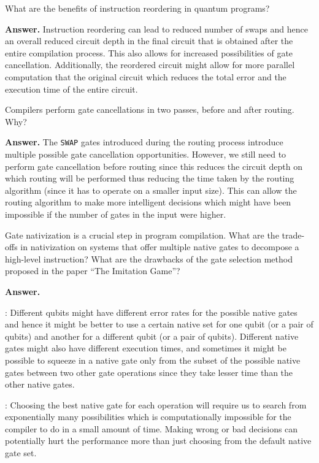 \begin{question}
    What are the benefits of instruction reordering in quantum programs?
\end{question}
\textbf{Answer.} Instruction reordering can lead to reduced number of swaps and hence an overall reduced circuit depth in the final circuit that is obtained after the entire compilation process. This also allows for increased possibilities of gate cancellation. Additionally, the reordered circuit might allow for more parallel computation that the original circuit which reduces the total error and the execution time of the entire circuit.

\tcbline{}

\begin{question}
    Compilers perform gate cancellations in two passes, before and after routing. Why?
\end{question}
\textbf{Answer.} The \texttt{SWAP} gates introduced during the routing process introduce multiple possible gate cancellation opportunities. However, we still need to perform gate cancellation before routing since this reduces the circuit depth on which routing will be performed thus reducing the time taken by the routing algorithm (since it has to operate on a smaller input size). This can allow the routing algorithm to make more intelligent decisions which might have been impossible if the number of gates in the input were higher.

\tcbline{}

\begin{question}
    Gate nativization is a crucial step in program compilation. What are the trade-offs in nativization on systems that offer multiple native gates to decompose a high-level instruction? What are the drawbacks of the gate selection method proposed in the paper ``The Imitation Game''?
\end{question}
\textbf{Answer.}

: Different qubits might have different error rates for the possible native gates and hence it might be better to use a certain native set for one qubit (or a pair of qubits) and another for a different qubit (or a pair of qubits). Different native gates might also have different execution times, and sometimes it might be possible to squeeze in a native gate only from the subset of the possible native gates between two other gate operations since they take lesser time than the other native gates.
\bigskip

: Choosing the best native gate for each operation will require us to search from exponentially many possibilities which is computationally impossible for the compiler to do in a small amount of time. Making wrong or bad decisions can potentially hurt the performance more than just choosing from the default native gate set.
\bigskip


